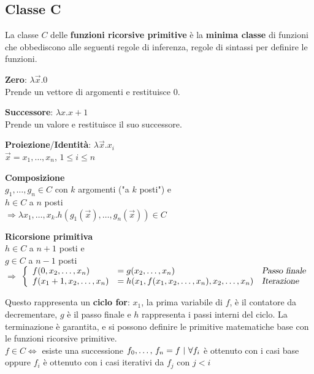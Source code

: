 \documentclass[10pt]{book}
\begin{document}
\subsection{Classe C}
La classe $C$ delle \textbf{funzioni ricorsive primitive} è la \textbf{minima classe} di funzioni che obbediscono alle seguenti regole di inferenza, regole di sintassi per definire le funzioni.\\
\begin{list}{}{\textbf{Casi base}}
	\item \textbf{Zero}: $\lambda \overrightarrow{x}.0$\\
	Prende un vettore di argomenti e restituisce 0.
	\item \textbf{Successore}: $\lambda x.x+1$\\
	Prende un valore e restituisce il suo successore.
	\item \textbf{Proiezione}/\textbf{Identità}: $\lambda \overrightarrow{x}.x_i$\\
	$\overrightarrow{x} = x_1,\ldots, x_n$, $1 \leq i \leq n$
\end{list}
\begin{list}{}{\textbf{Casi iterativi}}
	\item \textbf{Composizione}\\
	$g_1,\ldots, g_n \in C$ con $k$ argomenti ("a $k$ posti") e\\
	$h \in C$ a $n$ posti\\
	$\Rightarrow \lambda x_1, \ldots, x_k.h(g_1(\overrightarrow{x}),\ldots, g_n(\overrightarrow{x})) \in C$
	\item \textbf{Ricorsione primitiva}\\
	$h \in C$ a $n + 1$ posti e\\
	$g \in C$ a $n - 1$ posti\\
	$\Rightarrow$
	$\left\{
		\begin{array}{l l l}
			f(0, x_2, \ldots, x_n)&= g(x_2, \ldots, x_n)&\textsl{Passo finale}\\
			f(x_1 + 1, x_2, \ldots, x_n)&= h(x_1, f(x_1, x_2, \ldots, x_n), x_2,\ldots, x_n)&\textsl{Iterazione}
		\end{array}
		\right.$
\end{list}
Questo rappresenta un \textbf{ciclo for}: $x_1$, la prima variabile di $f$, è il contatore da decrementare, $g$ è il passo finale e $h$ rappresenta i passi interni del ciclo. La terminazione è garantita, e si possono definire le primitive matematiche base con le funzioni ricorsive primitive.\\
$f \in C \Leftrightarrow$ esiste una successione $f_0,\ldots,\,f_n = f\:\:\vline\:\:\forall f_i$ è ottenuto con i casi base oppure $f_i$ è ottenuto con i casi iterativi da $f_j$ con $j < i$
\pagebreak
\end{document}
